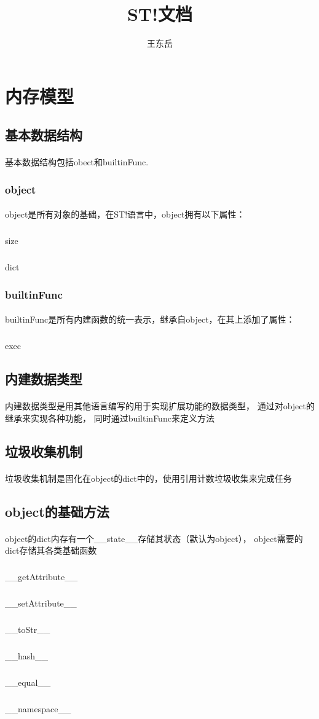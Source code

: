 \documentclass[UTF8, 12pt, a4paper]{article}
\author{王东岳}
\title{ST!文档}
\begin{document}
	\maketitle
	\newpage
	\section{内存模型}
		\subsection{基本数据结构}
			\paragraph{}
				基本数据结构包括obect和builtinFunc.
		\subsubsection{object}
			\paragraph{}
				object是所有对象的基础，在ST!语言中，object拥有以下属性：
				\subparagraph {} size
				\subparagraph {} dict
		\subsubsection{builtinFunc}
			\paragraph{}
				builtinFunc是所有内建函数的统一表示，继承自object，在其上添加了属性：
				\subparagraph {} exec
		\subsection{内建数据类型}
			\paragraph{}
				内建数据类型是用其他语言编写的用于实现扩展功能的数据类型，
				通过对object的继承来实现各种功能，
				同时通过builtinFunc来定义方法
		\subsection{垃圾收集机制}
			\paragraph{}
				垃圾收集机制是固化在object的dict中的，使用引用计数垃圾收集来完成任务
		\subsection{object的基础方法}
			\paragraph{}
				object的dict内存有一个\_\_state\_\_存储其状态（默认为object），
				object需要的dict存储其各类基础函数
			\subparagraph{} \_\_getAttribute\_\_
			\subparagraph{} \_\_setAttribute\_\_
			\subparagraph{} \_\_toStr\_\_
			\subparagraph{} \_\_hash\_\_
			\subparagraph{} \_\_equal\_\_
			\subparagraph{} \_\_namespace\_\_
\end{document}

